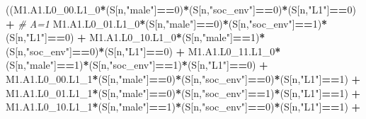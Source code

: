 \documentclass[
]{book}
\newenvironment{Shaded}{\begin{snugshade}}{\end{snugshade}}
\newcommand{\CommentTok}[1]{\textcolor[rgb]{0.56,0.35,0.01}{\textit{#1}}}
\newcommand{\DecValTok}[1]{\textcolor[rgb]{0.00,0.00,0.81}{#1}}
\newcommand{\NormalTok}[1]{#1}
\newcommand{\SpecialCharTok}[1]{\textcolor[rgb]{0.81,0.36,0.00}{\textbf{#1}}}
\newcommand{\StringTok}[1]{\textcolor[rgb]{0.31,0.60,0.02}{#1}}
\begin{document}
\begin{Shaded}
\begin{Highlighting}[]
\NormalTok{      ((M1.A1.L0\_00.L1\_0}\SpecialCharTok{*}\NormalTok{(S[n,}\StringTok{"male"}\NormalTok{]}\SpecialCharTok{==}\DecValTok{0}\NormalTok{)}\SpecialCharTok{*}\NormalTok{(S[n,}\StringTok{"soc\_env"}\NormalTok{]}\SpecialCharTok{==}\DecValTok{0}\NormalTok{)}\SpecialCharTok{*}\NormalTok{(S[n,}\StringTok{"L1"}\NormalTok{]}\SpecialCharTok{==}\DecValTok{0}\NormalTok{) }\SpecialCharTok{+} \CommentTok{\# A\textquotesingle{}=1             }
\NormalTok{          M1.A1.L0\_01.L1\_0}\SpecialCharTok{*}\NormalTok{(S[n,}\StringTok{"male"}\NormalTok{]}\SpecialCharTok{==}\DecValTok{0}\NormalTok{)}\SpecialCharTok{*}\NormalTok{(S[n,}\StringTok{"soc\_env"}\NormalTok{]}\SpecialCharTok{==}\DecValTok{1}\NormalTok{)}\SpecialCharTok{*}\NormalTok{(S[n,}\StringTok{"L1"}\NormalTok{]}\SpecialCharTok{==}\DecValTok{0}\NormalTok{) }\SpecialCharTok{+}
\NormalTok{          M1.A1.L0\_10.L1\_0}\SpecialCharTok{*}\NormalTok{(S[n,}\StringTok{"male"}\NormalTok{]}\SpecialCharTok{==}\DecValTok{1}\NormalTok{)}\SpecialCharTok{*}\NormalTok{(S[n,}\StringTok{"soc\_env"}\NormalTok{]}\SpecialCharTok{==}\DecValTok{0}\NormalTok{)}\SpecialCharTok{*}\NormalTok{(S[n,}\StringTok{"L1"}\NormalTok{]}\SpecialCharTok{==}\DecValTok{0}\NormalTok{) }\SpecialCharTok{+} 
\NormalTok{          M1.A1.L0\_11.L1\_0}\SpecialCharTok{*}\NormalTok{(S[n,}\StringTok{"male"}\NormalTok{]}\SpecialCharTok{==}\DecValTok{1}\NormalTok{)}\SpecialCharTok{*}\NormalTok{(S[n,}\StringTok{"soc\_env"}\NormalTok{]}\SpecialCharTok{==}\DecValTok{1}\NormalTok{)}\SpecialCharTok{*}\NormalTok{(S[n,}\StringTok{"L1"}\NormalTok{]}\SpecialCharTok{==}\DecValTok{0}\NormalTok{) }\SpecialCharTok{+}
\NormalTok{          M1.A1.L0\_00.L1\_1}\SpecialCharTok{*}\NormalTok{(S[n,}\StringTok{"male"}\NormalTok{]}\SpecialCharTok{==}\DecValTok{0}\NormalTok{)}\SpecialCharTok{*}\NormalTok{(S[n,}\StringTok{"soc\_env"}\NormalTok{]}\SpecialCharTok{==}\DecValTok{0}\NormalTok{)}\SpecialCharTok{*}\NormalTok{(S[n,}\StringTok{"L1"}\NormalTok{]}\SpecialCharTok{==}\DecValTok{1}\NormalTok{) }\SpecialCharTok{+}
\NormalTok{          M1.A1.L0\_01.L1\_1}\SpecialCharTok{*}\NormalTok{(S[n,}\StringTok{"male"}\NormalTok{]}\SpecialCharTok{==}\DecValTok{0}\NormalTok{)}\SpecialCharTok{*}\NormalTok{(S[n,}\StringTok{"soc\_env"}\NormalTok{]}\SpecialCharTok{==}\DecValTok{1}\NormalTok{)}\SpecialCharTok{*}\NormalTok{(S[n,}\StringTok{"L1"}\NormalTok{]}\SpecialCharTok{==}\DecValTok{1}\NormalTok{) }\SpecialCharTok{+}
\NormalTok{          M1.A1.L0\_10.L1\_1}\SpecialCharTok{*}\NormalTok{(S[n,}\StringTok{"male"}\NormalTok{]}\SpecialCharTok{==}\DecValTok{1}\NormalTok{)}\SpecialCharTok{*}\NormalTok{(S[n,}\StringTok{"soc\_env"}\NormalTok{]}\SpecialCharTok{==}\DecValTok{0}\NormalTok{)}\SpecialCharTok{*}\NormalTok{(S[n,}\StringTok{"L1"}\NormalTok{]}\SpecialCharTok{==}\DecValTok{1}\NormalTok{) }\SpecialCharTok{+}

\end{Highlighting}
\end{Shaded}
\end{document}
